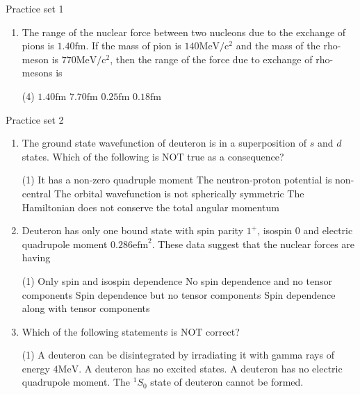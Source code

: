 \newpage
\begin{abox}
	Practice set 1
	\end{abox}
\begin{enumerate}
	\item The range of the nuclear force between two nucleons due to the exchange of pions is $1.40 \mathrm{fm}$. If the mass of pion is $140 \mathrm{MeV} / \mathrm{c}^{2}$ and the mass of the rho-meson is $770 \mathrm{MeV} / \mathrm{c}^{2}$, then the range of the force due to exchange of rho-mesons is
{}
\begin{tasks}(4)
	\task[\textbf{A.}] $1.40 \mathrm{fm}$
	\task[\textbf{B.}]$7.70 \mathrm{fm}$
	\task[\textbf{C.}]$0.25 \mathrm{fm}$
	\task[\textbf{D.}]$0.18 \mathrm{fm}$
\end{tasks}
\end{enumerate}
\newpage
\begin{abox}
	Practice set 2
	\end{abox}
\begin{enumerate}
\item The ground state wavefunction of deuteron is in a superposition of $s$ and $d$ states. Which of the following is NOT true as a consequence?
{}
\begin{tasks}(1)
	\task[\textbf{A.}] It has a non-zero quadruple moment 
	\task[\textbf{B.}]The neutron-proton potential is non-central
	\task[\textbf{C.}] The orbital wavefunction is not spherically symmetric
	\task[\textbf{D.}]The Hamiltonian does not conserve the total angular momentum
\end{tasks}
\item Deuteron has only one bound state with spin parity $1^{+}$, isospin 0 and electric quadrupole moment $0.286 \mathrm{efm}^{2}$. These data suggest that the nuclear forces are having
{}
\begin{tasks}(1)
	\task[\textbf{A.}] Only spin and isospin dependence
	\task[\textbf{B.}] No spin dependence and no tensor components
	\task[\textbf{C.}]Spin dependence but no tensor components
	\task[\textbf{D.}]Spin dependence along with tensor components
\end{tasks}
\item Which of the following statements is NOT correct?
{}
\begin{tasks}(1)
	\task[\textbf{A.}] A deuteron can be disintegrated by irradiating it with gamma rays of energy $4 \mathrm{MeV}$.
	\task[\textbf{B.}] A deuteron has no excited states.
	\task[\textbf{C.}] A deuteron has no electric quadrupole moment.
	\task[\textbf{D.}] The ${ }^{1} S_{0}$ state of deuteron cannot be formed.
\end{tasks}	
\end{enumerate}

